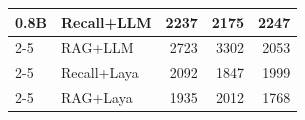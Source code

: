 \begin{tabular}{|l|l|r|r|r|}
\hline
0.8B & Recall+LLM & 2237 & 2175 & 2247 \\ %
\cline{2-5}
 & RAG+LLM & 2723 & 3302 & 2053 \\ %
\cline{2-5}
 & Recall+Laya & 2092 & 1847 & 1999 \\ %
\cline{2-5}
 & RAG+Laya & 1935 & 2012 & 1768 \\ %
\hline
\end{tabular}

